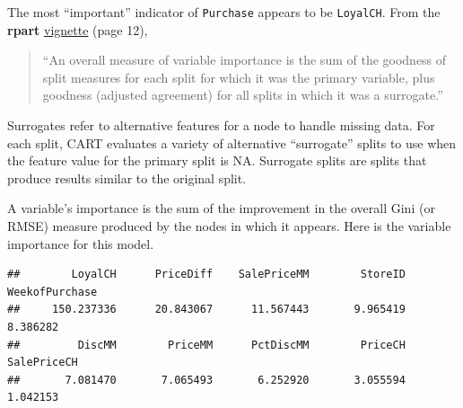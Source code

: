 \documentclass[
]{book}
\newenvironment{Shaded}{\begin{snugshade}}{\end{snugshade}}
\newcommand{\NormalTok}[1]{#1}
\newcommand{\OperatorTok}[1]{\textcolor[rgb]{0.81,0.36,0.00}{\textbf{#1}}}
\begin{document}
The most ``important'' indicator of \texttt{Purchase} appears to be \texttt{LoyalCH}. From the \textbf{rpart} \href{https://cran.r-project.org/web/packages/rpart/vignettes/longintro.pdf}{vignette} (page 12),

\begin{quote}
``An overall measure of variable importance is the sum of the goodness of split measures for each split for which it was the primary variable, plus goodness (adjusted agreement) for all splits in which it was a surrogate.''
\end{quote}

Surrogates refer to alternative features for a node to handle missing data. For each split, CART evaluates a variety of alternative ``surrogate'' splits to use when the feature value for the primary split is NA. Surrogate splits are splits that produce results similar to the original split.

A variable's importance is the sum of the improvement in the overall Gini (or RMSE) measure produced by the nodes in which it appears. Here is the variable importance for this model.

\begin{Shaded}
\end{Shaded}

\begin{verbatim}
##        LoyalCH      PriceDiff    SalePriceMM        StoreID WeekofPurchase 
##     150.237336      20.843067      11.567443       9.965419       8.386282 
##         DiscMM        PriceMM      PctDiscMM        PriceCH    SalePriceCH 
##       7.081470       7.065493       6.252920       3.055594       1.042153
\end{verbatim}
\end{document}
